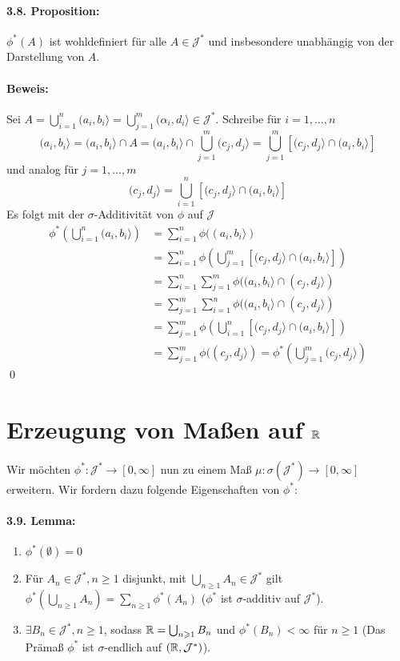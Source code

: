 \paragraph{3.8. Proposition:}$\phi^*(A)$ ist wohldefiniert f\"ur alle $A\in\mathcal{J}^*$ und insbesondere unabh\"angig von der Darstellung von $A$.
 
 \paragraph{Beweis:}Sei $A=\bigcup_{i=1}^n(a_i,b_i\rangle=\bigcup_{j=1}^m(\alpha_i,d_i\rangle\in\mathcal{J}^*$. Schreibe f\"ur $i=1,\hdots,n$
$$(a_i,b_i\rangle=(a_i,b_i\rangle\cap A=(a_i,b_i\rangle\cap\bigcup_{j=1}^m(c_j,d_j\rangle=\bigcup_{j=1}^m\left[(c_j,d_j\rangle\cap(a_i,b_i\rangle\right]$$
 und analog f\"ur $j=1,\hdots,m$
 $$(c_j,d_j\rangle=\bigcup_{i=1}^n\left[(c_j,d_j\rangle\cap(a_i,b_i\rangle\right]$$
 Es folgt mit der $\sigma$-Additivit\"at von $\phi$ auf $\mathcal{J}$
 \begin{align*}
     \phi^*\left(\bigcup_{i=1}^n(a_i,b_i\rangle\right)&=\sum_{i=1}^n\phi((a_i,b_i\rangle)\\
     &=\sum_{i=1}^n\phi\left(\bigcup_{j=1}^m\left[(c_j,d_j\rangle\cap(a_i,b_i\rangle\right]\right)\\
     &=\sum_{i=1}^n\sum_{j=1}^m\phi((a_i,b_i\rangle\cap(c_j,d_j\rangle)\\
     &=\sum_{j=1}^m\sum_{i=1}^n\phi((a_i,b_i\rangle\cap(c_j,d_j\rangle)\\
     &=\sum_{j=1}^m\phi\left(\bigcup_{i=1}^n\left[(c_j,d_j\rangle\cap(a_i,b_i\rangle\right]\right)\\
     &=\sum_{j=1}^m\phi((c_j,d_j\rangle)=\phi^*\left(\bigcup_{j=1}^m(c_j,d_j\rangle\right)
 \end{align*}
 \qed
 
 \section*{Erzeugung von Ma\ss{}en auf $\mathbb{R}$}
 Wir m\"ochten $\phi^*:\mathcal{J}^*\to[0,\infty]$ nun zu einem Ma\ss{} $\mu:\sigma(\mathcal{J}^*)\to[0,\infty]$ erweitern. Wir fordern dazu folgende Eigenschaften von $\phi^*$:
 
\paragraph{3.9. Lemma:}
\begin{enumerate}[label=(\roman*)]
    \item $\phi^*(\emptyset)=0$
    \item F\"ur $A_n\in\mathcal{J}^*,n\geq1$ disjunkt, mit $\bigcup_{n\geq1}A_n\in\mathcal{J}^*$ gilt $\phi^*\left(\bigcup_{n\geq1}A_n\right)=\sum_{n\geq1}\phi^*(A_n)$ ($\phi^*$ ist $\sigma$-additiv auf $\mathcal{J}^*$).
    \item $\exists B_n\in\mathcal{J}^*,n\geq1$, sodass $\mathbb{R}=\bigcup_{n\geqslant1}B_n$ und $\phi^*(B_n)<\infty$ f\"ur $n\geq1$ (Das Pr\"ama\ss{} $\phi^*$ ist $\sigma$-endlich auf $(\mathbb{R},\mathcal{J}^*) $).
\end{enumerate}

